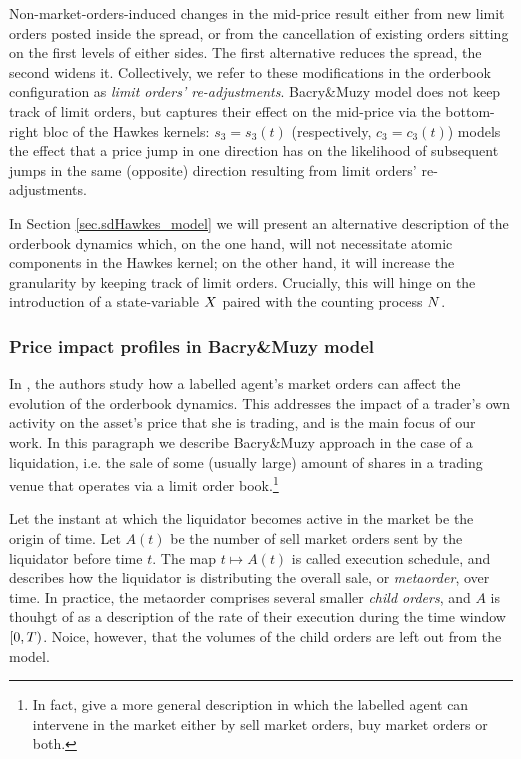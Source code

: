 \documentclass[10pt]{article}
\begin{document}
Non-market-orders-induced changes in the mid-price result either from new limit orders posted inside the spread, or from the cancellation of existing orders sitting on the first levels of either sides. The first alternative reduces the spread, the second widens it. Collectively, we refer to these modifications in the orderbook configuration as \emph{limit orders' re-adjustments}.   Bacry\&Muzy model does not keep track of limit orders, but captures their effect on the mid-price via the bottom-right bloc of the Hawkes kernels: $s_3=s_3(t)$ (respectively, $c_3=c_3(t)$)  models the effect that a price jump in one direction has on the likelihood of subsequent jumps in the same (opposite) direction resulting from limit orders' re-adjustments.

In Section \ref{sec.sdHawkes_model} we will present an alternative description of the orderbook dynamics which, on the one hand, will not necessitate atomic components in the Hawkes kernel; on the other hand, it will increase the granularity by keeping track of limit orders. Crucially, this will hinge on the introduction of a state-variable $X$ paired with the  counting process $N$. 

\subsubsection{Price impact profiles in Bacry\&Muzy model}\label{sec.BM14_price_impact_profiles}
In \citealp[Section 4]{BM14haw}, the authors study how a labelled agent's market orders can affect the evolution of the orderbook dynamics. This addresses the impact of a trader's own activity on the asset's price that she is trading, and is the main focus of our work. In this paragraph we describe Bacry\&Muzy approach in the case of a liquidation, i.e. the sale of some (usually large) amount of shares in a trading venue that operates via a limit order book.\footnote{In fact, \citealp{BM14haw} give a more general description in which the labelled agent can intervene in the market either by sell market orders, buy market orders or both.}

Let the instant at which the liquidator becomes active in the market be the origin of time. Let $A(t)$ be the number of sell market orders sent by the liquidator before time  $t$. The map $t\mapsto A(t)$ is called execution schedule, and describes how the liquidator is distributing the overall sale, or  \emph{metaorder}, over time.  In practice, the metaorder comprises several smaller \emph{child orders}, and $A$ is thouhgt of as a description of the rate of their execution during the time window $[0,T)$. Noice, however, that the volumes of the child orders are left out from the model. 
\end{document}
